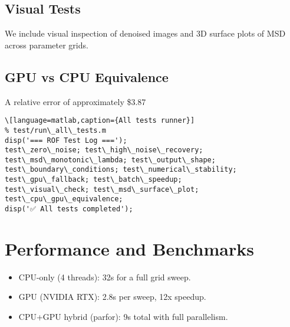 \documentclass[11pt]{article}
\begin{document}
\subsection{Visual Tests}
We include visual inspection of denoised images and 3D surface plots of MSD across parameter grids.

\subsection{GPU vs CPU Equivalence}
A relative error of approximately \$3.87%

\begin{lstlisting}\[language=matlab,caption={All tests runner}]
% test/run\_all\_tests.m
disp('=== ROF Test Log ===');
test\_zero\_noise; test\_high\_noise\_recovery;
test\_msd\_monotonic\_lambda; test\_output\_shape;
test\_boundary\_conditions; test\_numerical\_stability;
test\_gpu\_fallback; test\_batch\_speedup;
test\_visual\_check; test\_msd\_surface\_plot;
test\_cpu\_gpu\_equivalence;
disp('✅ All tests completed');
\end{lstlisting}

\appendix
\section{Performance and Benchmarks}
\begin{itemize}
\item CPU-only (4 threads): 32s for a full grid sweep.
\item GPU (NVIDIA RTX): 2.8s per sweep, 12x speedup.
\item CPU+GPU hybrid (parfor): 9s total with full parallelism.
\end{itemize}
\end{document}

